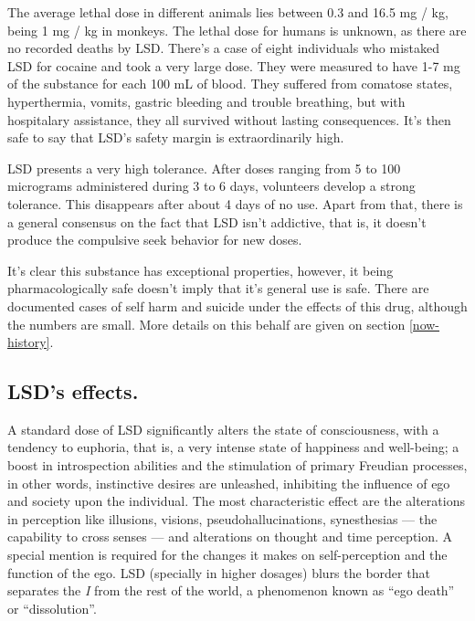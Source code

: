 The average lethal dose in different animals lies between 0.3 and 16.5 mg / kg, being 1 mg / kg in monkeys. The lethal dose for humans is unknown, as there are no recorded deaths by LSD. There's a case of eight individuals who mistaked LSD for cocaine and took a very large dose. They were measured to have 1-7 mg of the substance for each 100 mL of blood. They suffered from comatose states, hyperthermia, vomits, gastric bleeding and trouble breathing, but with hospitalary assistance, they all survived without lasting consequences. It's then safe to say that LSD's safety margin is extraordinarily high.

LSD presents a very high tolerance. After doses ranging from 5 to 100 micrograms administered during 3 to 6 days, volunteers develop a strong tolerance. This disappears after about 4 days of no use. Apart from that, there is a general consensus on the fact that LSD isn't addictive, that is, it doesn't produce the compulsive seek behavior for new doses.

It's clear this substance has exceptional properties, however, it being pharmacologically safe doesn't imply that it's general use is safe. There are documented cases of self harm and suicide under the effects of this drug, although the numbers are small. More details on this behalf are given on section \ref{now-history}.

\newpage

\subsection{LSD's effects.}

A standard dose of LSD significantly alters the state of consciousness, with a tendency to euphoria, that is, a very intense state of happiness and well-being; a boost in introspection abilities and the stimulation of primary Freudian processes, in other words, instinctive desires are unleashed, inhibiting the influence of ego and society upon the individual. The most characteristic effect are the alterations in perception like illusions, visions, pseudohallucinations, synesthesias --- the capability to cross senses --- and alterations on thought and time perception. A special mention is required for the changes it makes on self-perception and the function of the ego. LSD (specially in higher dosages) blurs the border that separates the \textit{I} from the rest of the world, a phenomenon known as \enquote{ego death} or \enquote{dissolution}.


